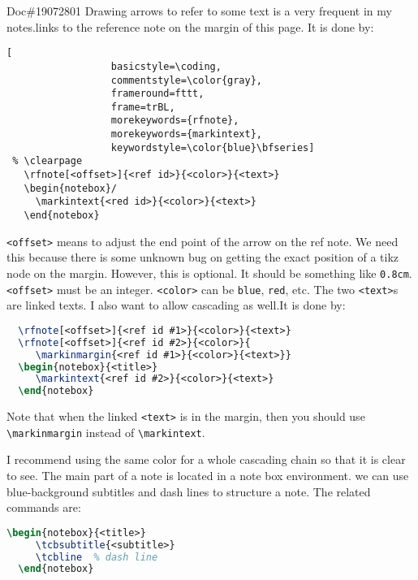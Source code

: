 \documentclass{flownotes}
\begin{document}
\clearpage
{}
\begin{notebox}{Doc\#19072801}
Drawing arrows to refer to some text is a very frequent in my notes.links to the reference note on the margin of this page. It is done by:
{
\begin{lstlisting}[
                  basicstyle=\coding,
                  commentstyle=\color{gray},
                  frameround=fttt,
                  frame=trBL,
                  morekeywords={rfnote},
                  morekeywords={markintext},
                  keywordstyle=\color{blue}\bfseries]
 % \clearpage
   \rfnote[<offset>]{<ref id>}{<color>}{<text>}
   \begin{notebox}/
     \markintext{<red id>}{<color>}{<text>}
   \end{notebox}
\end{lstlisting}}
\texttt{<offset>} means to adjust the end point of the arrow on the ref note. We need this because there is some unknown bug on getting the exact position of a tikz node on the margin. However, this is optional. It should be something like \texttt{0.8cm}. \texttt{<offset>} must be an integer. \texttt{<color>} can be \texttt{blue}, \texttt{red}, etc. The two \texttt{<text>}s are linked texts.
\tcbline
I also want to allow cascading as well.It is done by:
\begin{lstlisting}[language=TeX,
                  basicstyle=\coding,
                  commentstyle=\color{gray}]
  % \clearpage
  \rfnote[<offset>]{<ref id #1>}{<color>}{<text>}
  \rfnote[<offset>]{<ref id #2>}{<color>}{
     \markinmargin{<ref id #1>}{<color>}{<text>}}
  \begin{notebox}{<title>}
     \markintext{<ref id #2>}{<color>}{<text>}
  \end{notebox}
\end{lstlisting}
Note that when the linked \texttt{<text>} is in the margin, then you should use \texttt{\textbackslash markinmargin} instead of \texttt{\textbackslash markintext}.

I recommend using the same color for a whole cascading chain so that it is clear to see.
The main part of a note is located in a note box environment. we can use blue-background subtitles and dash lines to structure a note. The related commands are:
\begin{lstlisting}[language=TeX,
                  basicstyle=\coding,
                  commentstyle=\color{gray}]
  \begin{notebox}{<title>}
     \tcbsubtitle{<subtitle>}
     \tcbline  % dash line
  \end{notebox}
\end{lstlisting}
\end{notebox}
\end{document}

